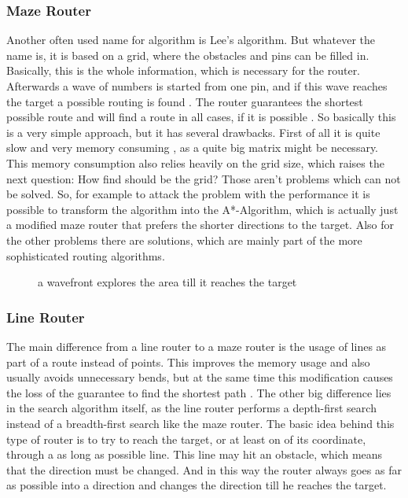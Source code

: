 \subsubsection{Maze Router}
Another often used name for algorithm is Lee's algorithm. But whatever the name is, it is based on a grid, where the obstacles and pins can be filled in. Basically, this is the whole information, which is necessary for the router. Afterwards a wave of numbers is started from one pin, and if this wave reaches the target a possible routing is found . The router guarantees the shortest possible route and will find a route in all cases, if it is possible \cite[p. 693]{kaufmann:electronic_design_automation}. So basically this is a very simple approach, but it has several drawbacks. First of all it is quite slow and very memory consuming \cite[p. 693]{kaufmann:electronic_design_automation}, as a quite big matrix might be necessary. This memory consumption also relies heavily on the grid size, which raises the next question: How find should be the grid? Those aren't problems which can not be solved. So, for example to attack the problem with the performance it is possible to transform the algorithm into the A*-Algorithm, which is actually just a modified maze router that prefers the shorter directions to the target. Also for the other problems there are solutions, which are mainly part of the more sophisticated routing algorithms.

\begin{figure}
	\centering
	
	\caption{a wavefront explores the area till it reaches the target}
	\label{fig:maze_router}
\end{figure}

\subsubsection{Line Router}
The main difference from a line router to a maze router is the usage of lines as part of a route instead of points. This improves the memory usage and also usually avoids unnecessary bends, but at the same time this modification causes the loss of the guarantee to find the shortest path \cite[p. 695]{kaufmann:electronic_design_automation}. The other big difference lies in the search algorithm itself, as the line router performs a depth-first search instead of a breadth-first search like the maze router. The basic idea behind this type of router is to try to reach the target, or at least on of its coordinate, through a as long as possible line. This line may hit an obstacle, which means that the direction must be changed. And in this way the router always goes as far as possible into a direction and changes the direction till he reaches the target.

